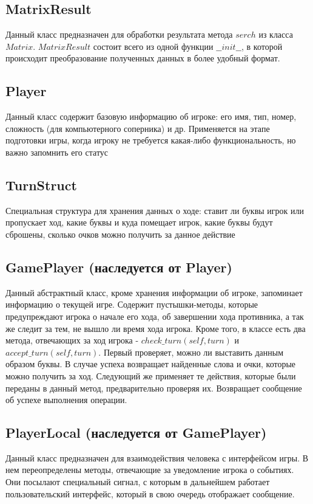 \documentclass[a4paper,14pt]{article}
\begin{document}
	\subsection{MatrixResult}
	Данный класс предназначен для обработки результата метода $serch$ из класса $Matrix$. $MatrixResult$ состоит всего из одной функции $\_\_init\_\_$, в которой происходит преобразование полученных данных в более удобный формат. 
	
	\subsection{Player}
	Данный класс содержит базовую информацию об игроке: его имя, тип, номер, сложность (для компьютерного соперника) и др. Применяется на этапе подготовки игры, когда игроку не требуется какая-либо функциональность, но важно запомнить его статус
	
	\subsection{TurnStruct}
	Специальная структура для хранения данных о ходе: ставит ли буквы игрок или пропускает ход, какие буквы и куда помещает игрок, какие буквы будут сброшены, сколько очков можно получить за данное действие
	
	\subsection[GamePlayer]{GamePlayer (наследуется от Player)}
	Данный абстрактный класс, кроме хранения информации об игроке, запоминает информацию о текущей игре. Содержит пустышки-методы, которые предупреждают игрока о начале его хода, об завершении хода противника, а так же следит за тем, не вышло ли время хода игрока. Кроме того, в классе есть два метода, отвечающих за ход игрока - $check\_turn(self, turn)$ и $accept\_turn(self, turn)$. Первый проверяет, можно ли выставить данным образом буквы. В случае успеха возвращает найденные слова и очки, которые можно получить за ход. Следующий же применяет те действия, которые были переданы в данный метод, предварительно проверяя их. Возвращает сообщение об успехе выполнения операции.
	
	\subsection[PlayerLocal]{PlayerLocal (наследуется от GamePlayer)}
	Данный класс предназначен для взаимодействия человека с интерфейсом игры. В нем переопределены методы, отвечающие за уведомление игрока о событиях. Они посылают специальный сигнал, с которым в дальнейшем работает пользовательский интерфейс, который в свою очередь отображает сообщение.
	
\end{document}
